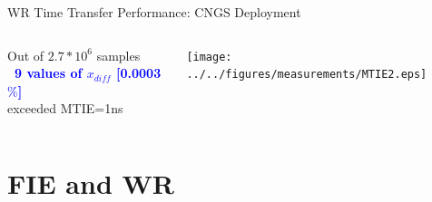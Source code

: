 \documentclass[compress,red]{beamer}
\begin{document}
\begin{frame}{WR Time Transfer Performance: CNGS Deployment}

  \begin{columns}[c]
	  \begin{center}

	    Out of $2.7*10^6$ samples\\
			\textbf{\textcolor{blue}{~9 values of $x_{diff}$ [0.0003$\%$]}} \\
                       exceeded MTIE=1ns
		


	  \end{center}
		\begin{center}
		\texttt{[image: ../../figures/measurements/MTIE2.eps]}
		\end{center}
  \end{columns}
\end{frame}


\section{FIE and WR}
\end{document}
